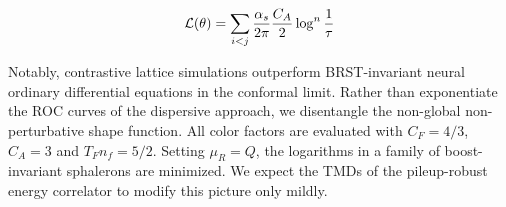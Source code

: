 \begin{equation}
  \mathcal{L}(\theta) = \sum_{i<j} \frac{\alpha_s}{2\pi} \frac{C_A}{2} \log^{n} \frac{1}{\tau}
  \label{eq:9}
\end{equation}

Notably, contrastive lattice simulations outperform BRST-invariant
neural ordinary differential equations in the conformal limit. Rather
than exponentiate the ROC curves of the dispersive approach, we
disentangle the non-global non-perturbative shape function. All color
factors are evaluated with $C_F = 4/3$, $C_A = 3$ and $T_F n_f = 5/2$.
Setting $\mu_R = Q$, the logarithms in a family of boost-invariant
sphalerons are minimized. We expect the TMDs of the pileup-robust energy
correlator to modify this picture only mildly.

